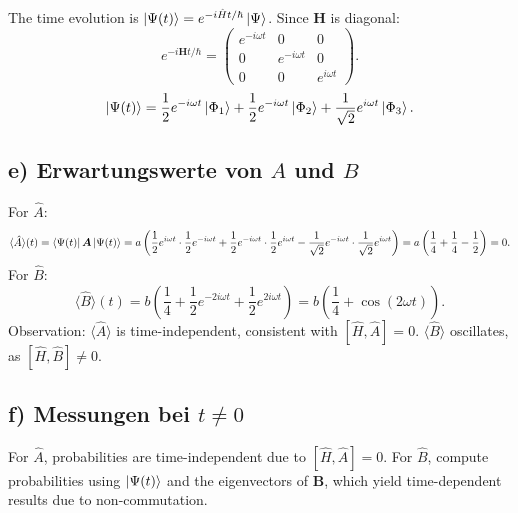 \documentclass[a4paper,12pt]{article}
\begin{document}
The time evolution is $\ket{\Psi(t)} = e^{-i \hat{H} t / \hbar} \ket{\Psi}$. Since $\boldsymbol{H}$ is diagonal:
\[
e^{-i \boldsymbol{H} t / \hbar} = \begin{pmatrix} e^{-i \omega t} & 0 & 0 \\ 0 & e^{-i \omega t} & 0 \\ 0 & 0 & e^{i \omega t} \end{pmatrix}.
\]
\[
\ket{\Psi(t)} = \frac{1}{2} e^{-i \omega t} \ket{\Phi_1} + \frac{1}{2} e^{-i \omega t} \ket{\Phi_2} + \frac{1}{\sqrt{2}} e^{i \omega t} \ket{\Phi_3}.
\]

\subsection*{e) Erwartungswerte von $A$ und $B$}

For $\hat{A}$:
\begin{dmath}
\langle \hat{A} \rangle(t) = \bra{\Psi(t)} \boldsymbol{A} \ket{\Psi(t)}
= a \left( \frac{1}{2} e^{i \omega t} \cdot \frac{1}{2} e^{-i \omega t} + \frac{1}{2} e^{-i \omega t} \cdot \frac{1}{2} e^{i \omega t} - \frac{1}{\sqrt{2}} e^{-i \omega t} \cdot \frac{1}{\sqrt{2}} e^{i \omega t} \right)
= a \left( \frac{1}{4} + \frac{1}{4} - \frac{1}{2} \right) = 0.
\end{dmath}
For $\hat{B}$:
\begin{dmath}
\langle \hat{B} \rangle(t) = b \left( \frac{1}{4} + \frac{1}{2} e^{-2i \omega t} + \frac{1}{2} e^{2i \omega t} \right)
= b \left( \frac{1}{4} + \cos(2 \omega t) \right).
\end{dmath}
Observation: $\langle \hat{A} \rangle$ is time-independent, consistent with $[\hat{H}, \hat{A}] = 0$. $\langle \hat{B} \rangle$ oscillates, as $[\hat{H}, \hat{B}] \neq 0$.

\subsection*{f) Messungen bei $t \neq 0$}

For $\hat{A}$, probabilities are time-independent due to $[\hat{H}, \hat{A}] = 0$. For $\hat{B}$, compute probabilities using $\ket{\Psi(t)}$ and the eigenvectors of $\boldsymbol{B}$, which yield time-dependent results due to non-commutation.
\end{document}
